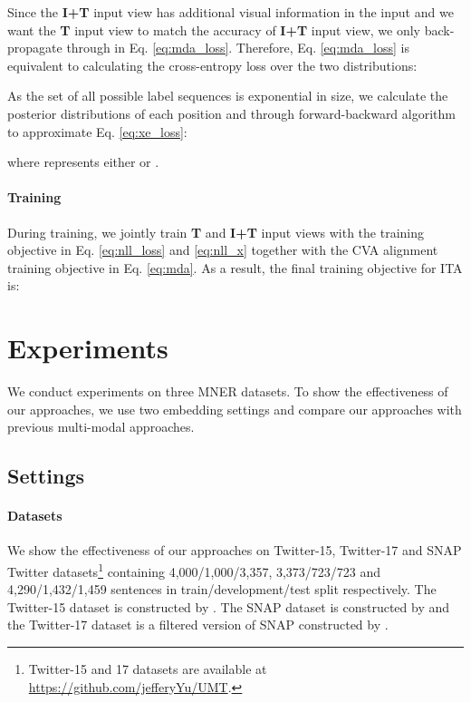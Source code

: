 \documentclass[11pt]{article}
\begin{document}
Since the \textbf{I+T} input view has additional visual information in the input and we want the \textbf{T} input view to match the accuracy of \textbf{I+T} input view, we only back-propagate through  in Eq. \ref{eq:mda_loss}. Therefore, Eq. \ref{eq:mda_loss} is equivalent to calculating the cross-entropy loss over the two distributions:

As the set of all possible label sequences  is exponential in size, we calculate the posterior distributions of each position  and  through forward-backward algorithm to approximate Eq. \ref{eq:xe_loss}:

where  represents either  or .
\paragraph{Training} During training, we jointly train \textbf{T} and \textbf{I+T} input views with the training objective in Eq. \ref{eq:nll_loss} and \ref{eq:nll_x} together with the CVA alignment training objective in Eq. \ref{eq:mda}. As a result, the final training objective for ITA is:










\section{Experiments}
\label{sec:exp}
We conduct experiments on three MNER datasets. To show the effectiveness of our approaches, we use two embedding settings and compare our approaches with previous multi-modal approaches.
\subsection{Settings}

\paragraph{Datasets}
We show the effectiveness of our approaches on Twitter-15, Twitter-17 and SNAP Twitter datasets\footnote{Twitter-15 and 17 datasets are available at \url{https://github.com/jefferyYu/UMT}.} containing 4,000/1,000/3,357, 3,373/723/723 and 4,290/1,432/1,459 sentences in train/development/test split respectively. The Twitter-15 dataset is constructed by \citet{zhang2018adaptive}. The SNAP dataset is constructed by \citet{lu-etal-2018-visual} and the Twitter-17 dataset is a filtered version of SNAP constructed by \citet{yu-etal-2020-improving-multimodal}.
\end{document}
